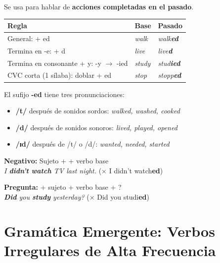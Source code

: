\documentclass[12pt,a4paper]{article}
\begin{document}
\begin{cajagrammar}
Se usa para hablar de \textbf{acciones completadas en el pasado}.

\medskip
\begin{tabularx}{\textwidth}{@{} l l l @{}}
\toprule
\textbf{Regla} & \textbf{Base} & \textbf{Pasado} \\
\midrule
General: + ed & \textit{walk} & \textit{walk\textbf{ed}} \\
Termina en -e: + d & \textit{live} & \textit{live\textbf{d}} \\
Termina en consonante + y: -y $\rightarrow$ -ied & \textit{study} & \textit{stud\textbf{ied}} \\
CVC corta (1 sílaba): doblar + ed & \textit{stop} & \textit{stopp\textbf{ed}} \\
\bottomrule
\end{tabularx}

\medskip
\begin{cajaejemplo}
El sufijo \textbf{-ed} tiene tres pronunciaciones:
\begin{itemize}[nosep, leftmargin=1cm]
  \item \textbf{/t/} después de sonidos sordos: \textit{walked, washed, cooked}
  \item \textbf{/d/} después de sonidos sonoros: \textit{lived, played, opened}
  \item \textbf{/ɪd/} después de /t/ o /d/: \textit{wanted, needed, started}
\end{itemize}
\end{cajaejemplo}

\medskip
\textbf{Negativo:} Sujeto +  + verbo base\\
\textit{I \textbf{didn't watch} TV last night.} \quad ($\times$ I didn't watch\textbf{ed})

\medskip
\textbf{Pregunta:}  + sujeto + verbo base + ?\\
\textit{\textbf{Did} you \textbf{study} yesterday?} \quad ($\times$ Did you studi\textbf{ed})
\end{cajagrammar}

\section{Gramática Emergente: Verbos Irregulares de Alta Frecuencia}
\end{document}
